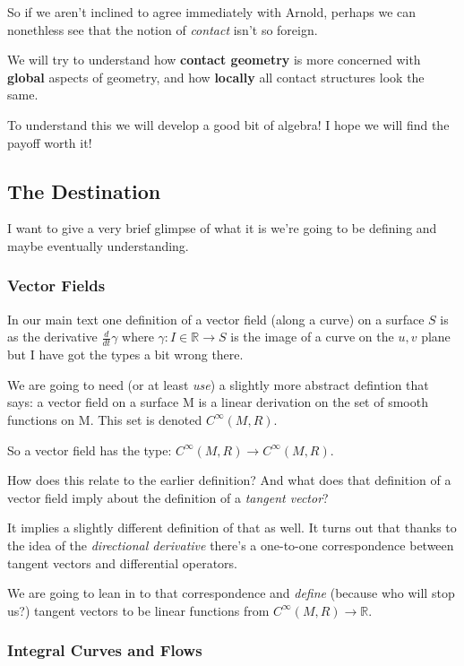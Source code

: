 \documentclass{article}
\begin{document}
So if we aren't inclined to agree immediately with Arnold, perhaps we can nonethless see
that the notion of \textsl{contact} isn't so foreign.

We will try to understand how \textbf{contact geometry} is more concerned with
\textbf{global} aspects of geometry, and how \textbf{locally} all contact
structures look the same.

To understand this we will develop a good bit of algebra! I hope we will find
the payoff worth it!

\subsection {The Destination}

I want to give a very brief glimpse of what it is we're going to be defining and
maybe eventually understanding.

\subsubsection {Vector Fields}

In our main text \cite{toponogov} one definition of a vector field (along a
curve) on a surface $S$ is as the derivative $\frac{d}{dt}\gamma$ where $\gamma : I \in
\mathbb{R} \to S$ is the image of a curve on the $u, v$ plane but I have got the
types a bit wrong there.

We are going to need (or at least \textsl{use}) a slightly more abstract
defintion that says: a vector field on a surface M is a linear derivation on the
set of smooth functions on M. This set is denoted $C^{\infty}(M, R)$.

So a vector field has the type: $C^{\infty}(M, R) \to C^{\infty}(M, R)$.

How does this relate to the earlier definition? And what does that definition of
a vector field imply about the definition of a \textsl{tangent vector}?

It implies a slightly different definition of that as well. It turns out that
thanks to the idea of the \textsl{directional derivative} there's a one-to-one
correspondence between tangent vectors and differential operators.

We are going to lean in to that correspondence and \textsl{define} (because who
will stop us?) tangent vectors to be linear functions from $C^{\infty}(M, R) \to
\mathbb{R}$.

\subsubsection {Integral Curves and Flows}
\end{document}
